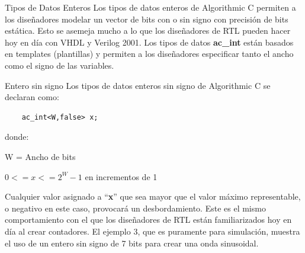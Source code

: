 \documentclass[11pt]{beamer}
\begin{document}
	\begin{frame}{Tipos de Datos Enteros}
	\justifying	
	Los tipos de datos enteros de Algorithmic C permiten a los diseñadores modelar un vector de bits con o sin signo con precisión de bits estática. Esto se asemeja mucho a lo que los diseñadores de RTL pueden hacer hoy en día con VHDL y Verilog 2001. Los tipos de datos \textbf{ac\_int} están basados en templates (plantillas) y permiten a los diseñadores especificar tanto el ancho como el signo de las variables.
	\end{frame}
	
	
	\begin{frame}[fragile]{Entero sin signo}
	\justifying
	Los tipos de datos enteros sin signo de Algorithmic C se declaran como:
	
	\begin{lstlisting}
	ac_int<W,false> x;
	\end{lstlisting}
	
	donde:
	
	W = Ancho de bits
	
    $0 <= x <= 2^W-1$ en incrementos de 1\newline
	
	 
	Cualquier valor asignado a “\textbf{x}” que sea mayor que el valor máximo representable, o negativo en este caso, provocará un desbordamiento. Este es el mismo comportamiento con el que los diseñadores de RTL están familiarizados hoy en día al crear contadores. El ejemplo 3, que es puramente para simulación, muestra el uso de un entero sin signo de 7 bits para crear una onda sinusoidal.
		
	\end{frame}
	
\end{document}
